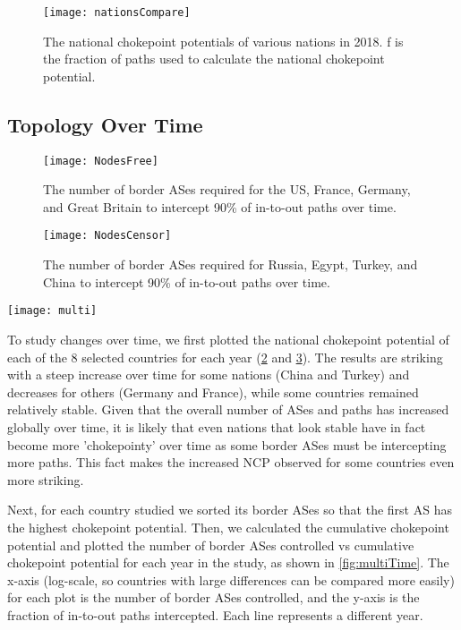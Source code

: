 \begin{figure}[ht]
	\centering
	\texttt{[image: nationsCompare]}
	\caption{The national chokepoint potentials of various nations in 2018. f is the
	fraction of paths used to calculate the national chokepoint potential.}\label{fig:nationsCompare}
\end{figure}

\subsection{Topology Over Time}

\begin{figure}
	\centering
	\texttt{[image: NodesFree]}
	\caption{The number of border ASes required for the US, France, Germany, and Great Britain to intercept 90\% of in-to-out paths over time.}\label{fig:nodesFree}
\end{figure}
\begin{figure}
	\centering
	\texttt{[image: NodesCensor]}
	\caption{The number of border ASes required for Russia, Egypt, Turkey, and China to intercept 90\% of in-to-out paths over time.}\label{fig:nodesCensor}
\end{figure}
\begin{figure*}
	\centering
	\texttt{[image: multi]}
	\caption{Chokepoint potential (in-to-out) for multiple years
          \timerange. Each plot shows the number of border ASes
          controlled (x-axis) vs. $f$ (y-axis).}\label{fig:multiTime}
\end{figure*}

To study changes over time, we first plotted the
national chokepoint potential of each of the 8 selected countries
for each year (\figurename \ref{fig:nodesFree} and \figurename
\ref{fig:nodesCensor}).  The results are striking with a steep increase
over time for some nations (China and Turkey) and decreases for others
(Germany and France), while some countries remained relatively
stable. Given that the overall number of ASes and paths has increased
globally over time, it is likely that even nations that look stable
have in fact become more 'chokepointy' over time as some border ASes
must be intercepting more paths.  This fact makes the increased NCP observed
for some countries even more striking.

Next, for each country studied we sorted its border ASes so
that the first AS has the highest chokepoint potential.
Then, we calculated the cumulative chokepoint potential
and plotted the
number of border ASes controlled vs cumulative chokepoint potential for each year in the study,
as shown in
\figurename \ref{fig:multiTime}.  The x-axis (log-scale,
so countries with large differences can be compared more
easily) for each plot is the number of border ASes controlled, and the y-axis
is the fraction of in-to-out paths intercepted. Each line represents a different
year.

